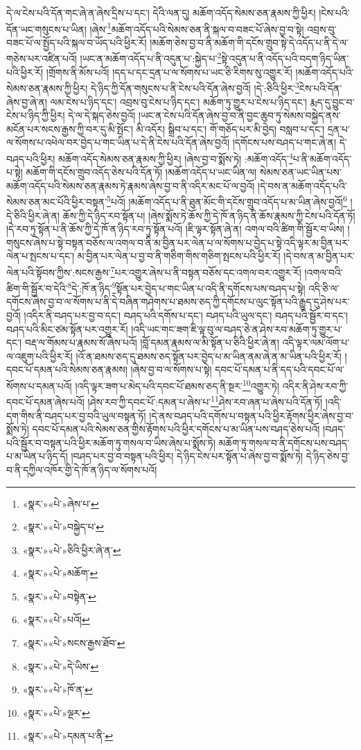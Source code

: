 དེ་ལ་ངེས་པའི་དོན་གང་ཞེ་ན་ཞེས་དྲིས་པ་དང་། དེའི་ལན་དུ། མཆོག་འདོད་སེམས་ཅན་རྣམས་ཀྱི་ཕྱིར། །ངེས་པའི་དོན་ཡང་གསུངས་པ་ཡིན། །ཞེས་\footnote{«སྣར་»«པེ་»ཞེས་པ་}མཆོག་འདོད་པའི་སེམས་ཅན་ནི་སྐལ་བ་བཟང་པོ་ཞེས་བྱ་བ་སྟེ། འབྲས་བུ་བཟང་པོ་ལ་སྤྱོད་པའི་སྐལ་བ་ཡོད་པའི་ཕྱིར་རོ། །མཆོག་ཅེས་བྱ་བ་ནི་མཆོག་གི་དངོས་གྲུབ་སྟེ་དེ་འདོད་པ་ནི་དེ་ལ་གཅེས་པར་འཛིན་པའོ། །ཡང་ན་མཆོག་འདོད་པ་ནི་འདུན་པ་:སྐྱེད་པ་\footnote{«སྣར་»«པེ་»བསྐྱེད་པ་}སྟེ་འདུན་པ་ནི་འདོད་པའི་བདག་ཉིད་ཡིན་པའི་ཕྱིར་རོ། །གྲོགས་ནི་མོས་པའོ། །དད་པ་དང་དྲན་པ་ལ་སོགས་པ་ཡང་ཅི་རིགས་སུ་འགྱུར་རོ། །མཆོག་འདོད་པའི་སེམས་ཅན་རྣམས་ཀྱི་ཕྱིར། དེ་ཉིད་ཀྱི་དོན་གསུངས་པ་ནི་ངེས་པའི་དོན་ཞེས་བྱའོ། །དེ་:ཅིའི་ཕྱིར་\footnote{«སྣར་»«པེ་»ཅིའི་ཕྱིར་ཞེ་ན་}ངེས་པའི་དོན་ཞེས་བྱ་ཞེ་ན། ལམ་ངེས་པ་ཉིད་དང་། འབྲས་བུ་ངེས་པ་ཉིད་དང་། མཆོག་ཏུ་གྱུར་པ་ངེས་པ་ཉིད་དང་། རྨད་དུ་བྱུང་བ་ངེས་པ་ཉིད་ཀྱི་ཕྱིར། དེ་ལ་དེ་སྐད་ཅེས་བྱའོ། །ཡང་ན་ངེས་པའི་དོན་ཞེས་བྱ་བ་ནི་བྱང་ཆུབ་ཏུ་སེམས་བསྐྱེད་ནས་མངོན་པར་སངས་རྒྱས་ཀྱི་བར་དུ་མི་སྤོང་། མི་འདོར། སྒྲིབ་པ་དང་། གོ་གཅོད་པར་མི་བྱེད། བསླབ་པ་དང་། དྲན་པ་ལ་སོགས་པ་འཕེལ་བར་བྱེད་པ་གང་ཡིན་པ་དེ་ནི་ངེས་པའི་དོན་ཞེས་བྱའོ། །དགོངས་པས་བཤད་པ་གང་ཞེ་ན། དེ་བཤད་པའི་ཕྱིར། མཆོག་འདོད་སེམས་ཅན་རྣམས་ཀྱི་ཕྱིར། །ཞེས་བྱ་བ་སྨོས་ཏེ། :མཆོག་འདོད་\footnote{«སྣར་»«པེ་»མཆོག་}པ་ནི་མཆོག་འདོད་པ་སྟེ། མཆོག་གི་དངོས་གྲུབ་འདོད་ཅེས་པའི་དོན་ཏོ། །མཆོག་འདོད་པ་ཡང་ཡིན་ལ། སེམས་ཅན་ཡང་ཡིན་པས་མཆོག་འདོད་པའི་སེམས་ཅན་རྣམས་ཏེ་རྣམས་ཞེས་བྱ་བ་ནི་འདིར་མང་པོ་ལ་བྱའོ། །དེ་བས་ན་མཆོག་འདོད་པའི་སེམས་ཅན་མང་པོའི་ཕྱིར་བསྟན་\footnote{«སྣར་»«པེ་»བསྟེན་}པའོ། །མཆོག་འདོད་པ་ནི་ཐུན་མོང་གི་དངོས་གྲུབ་འདོད་པ་མ་ཡིན་ཞེས་བྱའོ།\footnote{«སྣར་»«པེ་»པའོ།} །དེ་ཅིའི་ཕྱིར་ཞེ་ན། ཆོས་ཀྱི་དེ་ཉིད་རབ་སྟོན་པ། །ཞེས་སྨོས་ཏེ་ཆོས་ཀྱི་དེ་ཁོ་ན་ཉིད་ནི་ཆོས་རྣམས་ཀྱི་ངེས་པའི་དོན་ཏོ། །དེ་རབ་ཏུ་སྟོན་པ་ནི་ཆོས་ཀྱི་དེ་ཁོ་ན་ཉིད་རབ་ཏུ་སྟོན་པའོ། །ཇི་ལྟར་སྟོན་ཞེ་ན། འགལ་བའི་ཚིག་གི་སྦྱོར་བ་ཡིས། །གསུངས་ཞེས་པ་སྟེ་བསྟན་བཅོས་ལ་འགལ་བ་ནི་མ་བྱིན་པར་ལེན་པ་ལ་སོགས་པ་བྱེད་པ་སྟེ་འདི་ལྟར་མ་བྱིན་པར་ལེན་པ་སྤངས་པ་དང་། མ་བྱིན་པར་ལེན་པ་བྱ་བ་ནི་གཅིག་གིས་གཅིག་སྤངས་པའི་ཕྱིར་རོ། །དེ་བས་ན་མ་བྱིན་པར་ལེན་པའི་སྟོབས་ཀྱིས་:སངས་རྒྱས་\footnote{«སྣར་»«པེ་»སངས་རྒྱས་ཐོབ་}པར་འགྱུར་ཞེས་པ་ནི་བསྟན་བཅོས་དང་འགལ་བར་འགྱུར་རོ། །འགལ་བའི་ཚིག་གི་སྦྱོར་བ་དེའི་\footnote{«སྣར་»«པེ་»དེ་ཡིས་}དེ་:ཁོ་ན་ཉིད་\footnote{«སྣར་»«པེ་»ཁོ་ན་}སྟོན་པར་བྱེད་པ་གང་ཡིན་པ་འདི་ནི་དགོངས་པས་བཤད་པ་སྟེ། འདི་ཅི་ལ་དགོངས་ཞེས་བྱ་བ་ལ་སོགས་པ་ནི་དེ་བཞིན་གཤེགས་པ་ཐམས་ཅད་ཀྱི་དགོངས་པ་ལུང་སྟོན་པའི་རྒྱུད་དུ་ཤེས་པར་བྱའོ། །འདིར་ནི་བཤད་པར་བྱ་བ་དང་། བཤད་པའི་དགོས་པ་དང་། བཤད་པའི་ཡུལ་དང་། བཤད་པའི་སྦྱོར་བ་དང་། བཤད་པའི་མིང་ཙམ་སྟོན་པར་འགྱུར་རོ། །འདི་ཡང་གང་ཟག་ཇི་ལྟ་བུ་ལ་བཤད་ཅེ་ན་ཤེས་རབ་མཆོག་ཏུ་གྱུར་པ་དང་། བརྡ་ལ་གོམས་པ་རྣམས་སོ་ཞེས་པའོ། །བློ་དམན་རྣམས་ལ་མི་སྟོན་པ་ཅིའི་ཕྱིར་ཞེ་ན། འདི་ལྟར་ལམ་ལོག་པ་ལ་འཇུག་པའི་ཕྱིར་རོ། །འོ་ན་ཐམས་ཅད་དུ་ཐམས་ཅད་སྟོན་པར་བྱེད་པ་མ་ཡིན་ནམ་ཞེ་ན་མ་ཡིན་པའི་ཕྱིར་རོ། །དབང་པོ་དམན་པའི་སེམས་ཅན་རྣམས། །ཞེས་བྱ་བ་ལ་སོགས་པ་སྟེ། དབང་པོ་དམན་པ་ནི་དད་པའི་དབང་པོ་ལ་སོགས་པ་དམན་པའོ། །འདི་ལྟར་ཟག་པ་མེད་པའི་དབང་པོ་ཐམས་ཅད་ནི་སྔར་\footnote{«སྣར་»«པེ་»ལྔར་}འགྱུར་ཏེ། འདིར་ནི་ཤེས་རབ་ཀྱི་དབང་པོ་དམན་ཞེས་པའོ། །ཤེས་རབ་ཀྱི་དབང་པོ་:དམན་པ་ཞེས་པ་\footnote{«སྣར་»«པེ་»དམན་པ་ནི་}ཤེས་རབ་ཞན་པ་ཞེས་པའི་དོན་ཏོ། །འདི་དག་གིས་ནི་བཤད་པར་བྱ་བའི་ཡུལ་བསྟན་ཏོ། །དེ་ནས་བཤད་པའི་དགོས་པ་བསྟན་པའི་ཕྱིར་རྟོགས་ཕྱིར་ཞེས་བྱ་བ་སྨོས་ཏེ། དབང་པོ་དམན་པའི་སེམས་ཅན་གྱིས་རྟོགས་པའི་ཕྱིར་དགོངས་པ་མ་ཡིན་པས་བཤད་ཅེས་པའོ། །བཤད་པའི་སྦྱོར་བ་བསྟན་པའི་ཕྱིར་མཆོག་ཏུ་གསལ་བ་ཡིས་ཞེས་པ་སྨོས་ཏེ། མཆོག་ཏུ་གསལ་བ་ནི་དགོངས་པས་བཤད་པ་མ་ཡིན་པ་ཉིད་དོ། །བཤད་པར་བྱ་བ་བསྟན་པའི་ཕྱིར། དེ་ཉིད་ངེས་པར་སྟོན་པ་ཞེས་བྱ་བ་སྨོས་ཏེ། དེ་ཉིད་ཅེས་བྱ་བ་ནི་དཀྱིལ་འཁོར་གྱི་དེ་ཁོ་ན་ཉིད་ལ་སོགས་པའོ། 